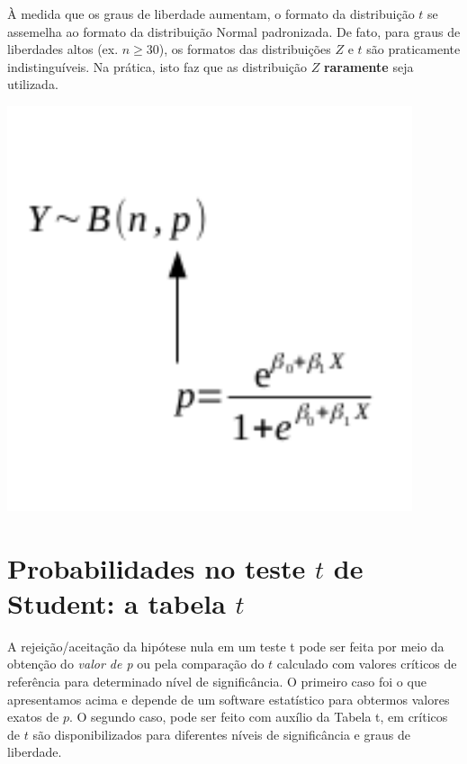 \documentclass[
]{book}
\begin{document}
À medida que os graus de liberdade aumentam, o formato da distribuição \(t\) se assemelha ao formato da distribuição Normal padronizada. De fato, para graus de liberdades altos (ex. \(n \ge 30\)), os formatos das distribuições \(Z\) e \(t\) são praticamente indistinguíveis. Na prática, isto faz que as distribuição \(Z\) \textbf{raramente} seja utilizada.

\includegraphics{probest-cambientais_files/figure-latex/unnamed-chunk-136-1.pdf}

\hypertarget{probabilidades-no-teste-t-de-student-a-tabela-t}{%
\section{\texorpdfstring{Probabilidades no teste \(t\) de Student: a tabela \(t\)}{Probabilidades no teste t de Student: a tabela t}}\label{probabilidades-no-teste-t-de-student-a-tabela-t}}

A rejeição/aceitação da hipótese nula em um teste t pode ser feita por meio da obtenção do \emph{valor de p} ou pela comparação do \(t\) calculado com valores críticos de referência para determinado nível de significância. O primeiro caso foi o que apresentamos acima e depende de um software estatístico para obtermos valores exatos de \(p\). O segundo caso, pode ser feito com auxílio da Tabela t, em críticos de \(t\) são disponibilizados para diferentes níveis de significância e graus de liberdade.
\end{document}
